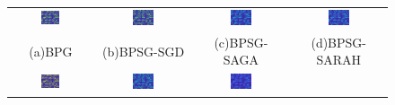 \documentclass[letterpaper]{article} %
\begin{document}
	\begin{figure}[!ht]
		\setlength\tabcolsep{1pt}
		\centering
		\begin{tabular}{cccc}
			\includegraphics[width=0.24\textwidth]{figs/ORL_32_BPG}
			&\includegraphics[width=0.24\textwidth]{figs/ORL_32_BPSG_SGD}
			&\includegraphics[width=0.24\textwidth]{figs/ORL_32_BPSG_SAGA}
			&\includegraphics[width=0.24\textwidth]{figs/ORL_32_BPSG_SARAH}\\
			(a)BPG&(b)BPSG-SGD&(c)BPSG-SAGA&(d)BPSG-SARAH\\
			\includegraphics[width=0.24\textwidth]{figs/ORL_32_BPGE}
			&\includegraphics[width=0.24\textwidth]{figs/ORL_32_BPSGE_SGD}
			&\includegraphics[width=0.24\textwidth]{figs/ORL_32_BPSGE_SAGA}

\end{tabular}
\end{figure}
\end{document}
